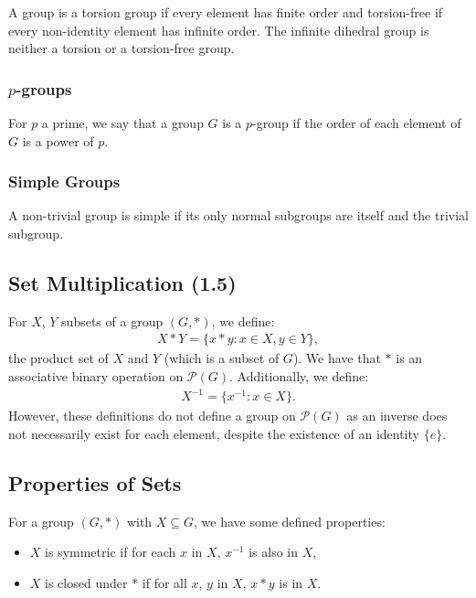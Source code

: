 A group is a torsion group if every element has finite order and 
torsion-free if every non-identity element has infinite order.
The infinite dihedral group is neither a torsion or a torsion-free
group.

\subsubsection{$p$-groups}

For $p$ a prime, we say that a group $G$ is a $p$-group if the order
of each element of $G$ is a power of $p$.

\subsubsection{Simple Groups}

A non-trivial group is simple if its only normal subgroups are itself 
and the trivial subgroup.

\subsection{Set Multiplication (1.5)} \label{1.5}

For $X$, $Y$ subsets of a group $(G, \ast)$, we define: \begin{align*}
    X \ast Y = \{x \ast y : x \in X, y \in Y\},
\end{align*} the product set of $X$ and $Y$ (which is a subset of $G$).
We have that $\ast$ is an associative binary operation on 
$\mathcal{P}(G)$. Additionally, we define: \begin{align*}
    X^{-1} = \{x^{-1} : x \in X\}.
\end{align*} However, these definitions do not define a group on
$\mathcal{P}(G)$ as an inverse does not necessarily exist for each
element, despite the existence of an identity $\{e\}$.

\subsection{Properties of Sets}

For a group $(G, \ast)$ with $X \subseteq G$, we have some defined properties:
\begin{itemize}
    \item $X$ is symmetric if for each $x$ in $X$, $x^{-1}$ is also in $X$,
    \item $X$ is closed under $\ast$ if for all $x$, $y$ in $X$, $x \ast y$ is in $X$.
\end{itemize}

